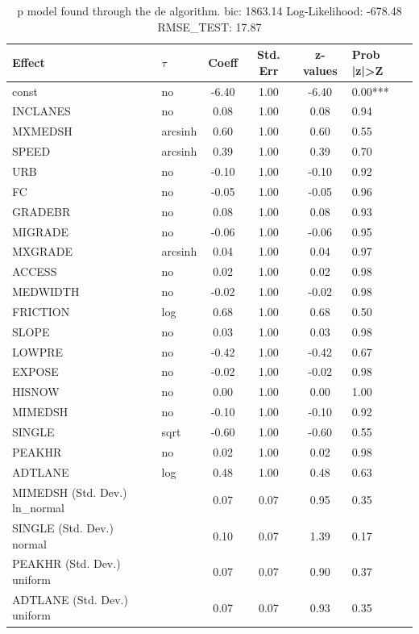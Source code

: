 \begin{table}
	\caption{p model found through the de algorithm. bic: 1863.14 Log-Likelihood: -678.48 RMSE_TEST: 17.87}
	\begin{center}
		\begin{tabular}{|l|l|c|c|c|l|}
			\hline
			Effect & $\tau$ & Coeff & Std. Err & z-values & Prob |z|>Z \\
			\hline
			const & no & -6.40 & 1.00 & -6.40 & 0.00*** \\
			\hline
			INCLANES & no & 0.08 & 1.00 & 0.08 & 0.94 \\
			\hline
			MXMEDSH & arcsinh & 0.60 & 1.00 & 0.60 & 0.55 \\
			\hline
			SPEED & arcsinh & 0.39 & 1.00 & 0.39 & 0.70 \\
			\hline
			URB & no & -0.10 & 1.00 & -0.10 & 0.92 \\
			\hline
			FC & no & -0.05 & 1.00 & -0.05 & 0.96 \\
			\hline
			GRADEBR & no & 0.08 & 1.00 & 0.08 & 0.93 \\
			\hline
			MIGRADE & no & -0.06 & 1.00 & -0.06 & 0.95 \\
			\hline
			MXGRADE & arcsinh & 0.04 & 1.00 & 0.04 & 0.97 \\
			\hline
			ACCESS & no & 0.02 & 1.00 & 0.02 & 0.98 \\
			\hline
			MEDWIDTH & no & -0.02 & 1.00 & -0.02 & 0.98 \\
			\hline
			FRICTION & log & 0.68 & 1.00 & 0.68 & 0.50 \\
			\hline
			SLOPE & no & 0.03 & 1.00 & 0.03 & 0.98 \\
			\hline
			LOWPRE & no & -0.42 & 1.00 & -0.42 & 0.67 \\
			\hline
			EXPOSE & no & -0.02 & 1.00 & -0.02 & 0.98 \\
			\hline
			HISNOW & no & 0.00 & 1.00 & 0.00 & 1.00 \\
			\hline
			MIMEDSH & no & -0.10 & 1.00 & -0.10 & 0.92 \\
			\hline
			SINGLE & sqrt & -0.60 & 1.00 & -0.60 & 0.55 \\
			\hline
			PEAKHR & no & 0.02 & 1.00 & 0.02 & 0.98 \\
			\hline
			ADTLANE & log & 0.48 & 1.00 & 0.48 & 0.63 \\
			\hline
			MIMEDSH (Std. Dev.) ln_normal &  & 0.07 & 0.07 & 0.95 & 0.35 \\
			\hline
			SINGLE (Std. Dev.) normal &  & 0.10 & 0.07 & 1.39 & 0.17 \\
			\hline
			PEAKHR (Std. Dev.) uniform &  & 0.07 & 0.07 & 0.90 & 0.37 \\
			\hline
			ADTLANE (Std. Dev.) uniform &  & 0.07 & 0.07 & 0.93 & 0.35 \\
			\hline
		\end{tabular}
	\end{center}
\end{table}